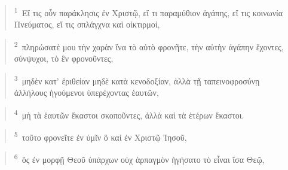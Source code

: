 \documentclass{article}
\newcommand{\currentverse}{1} %
\newcommand{\setcurrentverse}[1]{\renewcommand{\currentverse}{#1}}
\begin{document}
\begin{verse}

\setcurrentverse{1}

\setcounter{footnote}{0}

\textsuperscript{1}~Εἴ τις οὖν παράκλησις ἐν Χριστῷ, εἴ τι παραμύθιον ἀγάπης, εἴ τις κοινωνία Πνεύματος, εἴ τις σπλάγχνα καὶ οἰκτιρμοί,

\end{verse}

\begin{verse}

\setcurrentverse{2}

\setcounter{footnote}{0}

\textsuperscript{2}~πληρώσατέ μου τὴν χαρὰν ἵνα τὸ αὐτὸ φρονῆτε, τὴν αὐτὴν ἀγάπην ἔχοντες, σύνψυχοι, τὸ ἓν φρονοῦντες,

\end{verse}

\begin{verse}

\setcurrentverse{3}

\setcounter{footnote}{0}

\textsuperscript{3}~μηδὲν κατ’ ἐριθείαν μηδὲ κατὰ κενοδοξίαν, ἀλλὰ τῇ ταπεινοφροσύνῃ ἀλλήλους ἡγούμενοι ὑπερέχοντας ἑαυτῶν,

\end{verse}

\begin{verse}

\setcurrentverse{4}

\setcounter{footnote}{0}

\textsuperscript{4}~μὴ τὰ ἑαυτῶν ἕκαστοι σκοποῦντες, ἀλλὰ καὶ τὰ ἑτέρων ἕκαστοι.

\end{verse}

\begin{verse}

\setcurrentverse{5}

\setcounter{footnote}{0}

\textsuperscript{5}~τοῦτο φρονεῖτε ἐν ὑμῖν ὃ καὶ ἐν Χριστῷ Ἰησοῦ,

\end{verse}

\begin{verse}

\setcurrentverse{6}

\setcounter{footnote}{0}

\textsuperscript{6}~ὃς ἐν μορφῇ Θεοῦ ὑπάρχων οὐχ ἁρπαγμὸν ἡγήσατο τὸ εἶναι ἴσα Θεῷ,

\end{verse}
\end{document}
